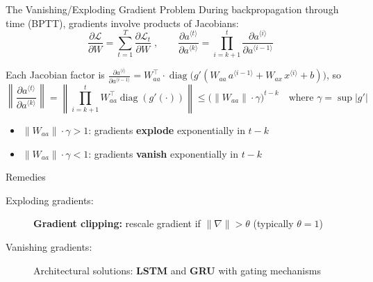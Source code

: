 \begin{frame}{The Vanishing/Exploding Gradient Problem}
  During backpropagation through time (BPTT), gradients involve products of Jacobians:
  \[
    \frac{\partial \mathcal{L}}{\partial W} = \sum_{t=1}^{T} \frac{\partial \mathcal{L}_t}{\partial W} \;, \qquad
    \frac{\partial a^{\langle t \rangle}}{\partial a^{\langle k \rangle}} = \prod_{i=k+1}^{t} \frac{\partial a^{\langle i \rangle}}{\partial a^{\langle i{-}1 \rangle}}
  \]

  Each Jacobian factor is
  $\frac{\partial a^{\langle i \rangle}}{\partial a^{\langle i{-}1 \rangle}} = W_{aa}^\top \cdot \operatorname{diag}\!\bigl(g'(W_{aa}\,a^{\langle i{-}1\rangle} + W_{ax}\,x^{\langle i\rangle} + b)\bigr)$, so
  \[
    \left\|\frac{\partial a^{\langle t \rangle}}{\partial a^{\langle k \rangle}}\right\|
    = \left\|\prod_{i=k+1}^{t} W_{aa}^\top \operatorname{diag}(g'(\cdot))\right\|
    \leq \bigl(\|W_{aa}\| \cdot \gamma\bigr)^{t-k}
    \quad \text{where } \gamma = \sup |g'|
  \]
  \begin{itemize}
    \item $\|W_{aa}\| \cdot \gamma > 1$: gradients \textbf{explode} exponentially in $t{-}k$
    \item $\|W_{aa}\| \cdot \gamma < 1$: gradients \textbf{vanish} exponentially in $t{-}k$
  \end{itemize}

  \vspace{0.5em}
  \begin{block}{Remedies}
    \begin{description}
      \item[Exploding gradients:] \textbf{Gradient clipping:} rescale gradient if $\|\nabla\| > \theta$ (typically $\theta = 1$) 
      \item[Vanishing gradients:] Architectural solutions: \textbf{LSTM} and \textbf{GRU} with gating mechanisms
    \end{description}
  \end{block}
\end{frame}

